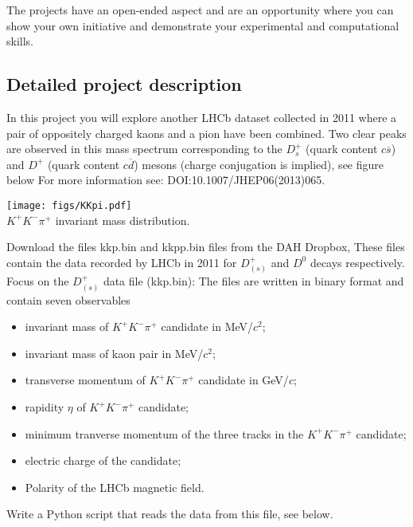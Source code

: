 The projects have an open-ended aspect and are an opportunity where you can show your own initiative and demonstrate your experimental and computational skills.



\subsection{Detailed project description}
 
In this project you will explore another LHCb dataset collected in 2011 where a pair of
oppositely charged kaons and a pion have been combined. Two clear
peaks are observed in this mass spectrum corresponding to the $D_s^+$ (quark content $c\overline{s}$)
and $D^+$ (quark content $c\overline{d}$) mesons (charge conjugation is implied), see figure below %
For more information see: {DOI:10.1007/JHEP06(2013)065}. 
%
\begin{center}
\texttt{[image: figs/KKpi.pdf]}\\
{\small $K^{+}K^{-}\pi^{+}$ invariant mass distribution.}
\end{center}
%

Download the files kkp.bin and kkpp.bin files  from the DAH Dropbox, 
These files contain the data recorded by LHCb in 2011 for $D_{(s)}^+$ and $D^0$ decays respectively. Focus on the $D_{(s)}^+$ data file (kkp.bin):
The files are written in binary format and contain seven observables
\begin{itemize}
\item  invariant mass of $K^{+}K^{-}\pi^{+}$  candidate  in  MeV/$c^2$;
\item  invariant mass of kaon pair in   MeV/$c^2$;
\item transverse momentum of  $K^{+}K^{-}\pi^{+}$  candidate  in GeV/$c$;
\item rapidity $\eta$ of $K^{+}K^{-}\pi^{+}$  candidate;
\item minimum tranverse momentum of the three tracks in the $K^{+}K^{-}\pi^{+}$  candidate;
\item electric charge of the candidate;
\item Polarity of the LHCb magnetic field.
\end{itemize}

Write a Python script that reads the data from this file, see below. 


